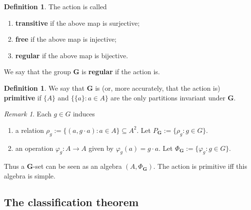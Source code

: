 \documentclass{amsart}
\theoremstyle{plain}
\theoremstyle{definition}
\newtheorem{definition}[theorem]{Definition}
\theoremstyle{remark}
\newtheorem{remark}[theorem]{Remark}
\def\phi{\varphi}
\DeclareMathOperator{\Pol}{Pol}
\begin{document}
\begin{definition}
    The action is called 
    \begin{enumerate}
        \item \textbf{transitive} if the above map is surjective; 
        \item \textbf{free} if the above map is injective; 
        \item \textbf{regular} if the above map is bijective. 
    \end{enumerate}
    We say that the group $\mathbf{G}$ is \textbf{regular} if the action is. 
\end{definition}

\begin{definition}
    We say that $\mathbf{G}$ is (or, more accurately, that the action is)
        \textbf{primitive} if $\{A\}$ and $\{\{a\} : a \in A\}$ are the only partitions invariant under $\mathbf{G}$. 
\end{definition}

\begin{remark}
    Each $g \in G$ induces 
    \begin{enumerate}
        \item a relation $\rho_g:=\{(a, g\cdot a) : a \in A\} \subseteq A^2$. 
        Let $P_{\mathbf{G}}:=\{\rho_g : g \in G\}$. 
        \item an operation $\phi_g: A \to A$ given by $\phi_g(a)=g \cdot a$. 
        Let $\Phi_\mathbf{G}:=\{\phi_g: g \in G\}$. 
    \end{enumerate}
    Thus a $\mathbf{G}$-set can be seen as an algebra $(A, \Phi_\mathbf{G})$. 
    The action is primitive iff this algebra is simple.
\end{remark}


\subsection{The classification theorem}
\end{document}
